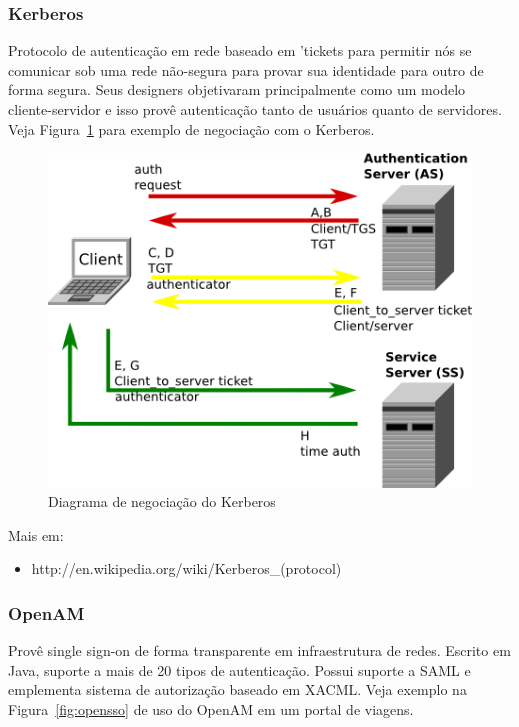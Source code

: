 \documentclass[11pt]{article}
\begin{document}
\subsubsection{Kerberos}

Protocolo de autenticação em rede baseado em 'tickets para permitir nós se
comunicar sob uma rede não-segura para provar sua identidade para outro de
forma segura. Seus designers objetivaram principalmente como um modelo
cliente-servidor e isso provê autenticação tanto de usuários quanto de
servidores. Veja Figura~\ref{fig:kerberos} para exemplo de negociação com o
Kerberos.

\begin{figure}[h]
\center
\includegraphics[scale=0.6]{kerberos.png}
\caption{Diagrama de negociação do Kerberos}
\label{fig:kerberos}
\end{figure}

Mais em:
\begin{itemize}
  \item{http://en.wikipedia.org/wiki/Kerberos\_(protocol)}
\end{itemize}

\subsubsection{OpenAM}

Provê single sign-on de forma transparente em infraestrutura de redes. Escrito
em Java, suporte a mais de 20 tipos de autenticação. Possui suporte a SAML e
emplementa sistema de autorização baseado em XACML. Veja exemplo na
Figura~\ref{fig:opensso} de uso do OpenAM em um portal de viagens.
\end{document}
